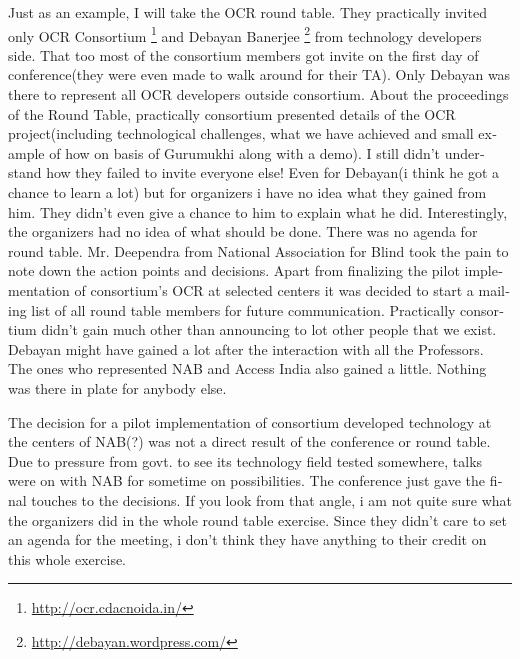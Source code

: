 \begin{english}
Just as an example, I will take the OCR round table. They practically invited only OCR Consortium \footnote{\url{http://ocr.cdacnoida.in/}} and Debayan Banerjee \footnote{\url{http://debayan.wordpress.com/}} from technology developers side. That too most of the consortium members got invite on the first day of conference(they were even made to walk around for their TA). Only Debayan was there to represent all OCR developers outside consortium. About the proceedings of the Round Table, practically consortium presented details of the OCR project(including technological challenges, what we have achieved and small example of how on basis of Gurumukhi along with a demo). I still didn’t understand how they failed to invite everyone else! Even for Debayan(i think he got a chance to learn a lot) but for organizers i have no idea what they gained from him. They didn’t even give a chance to him to explain what he did. Interestingly, the organizers had no idea of what should be done. There was no agenda for round table. Mr. Deependra from National Association for Blind took the pain to note down the action points and decisions. Apart from finalizing the pilot implementation of consortium’s OCR at selected centers it was decided to start a mailing list of all round table members for future communication. Practically consortium didn’t gain much other than announcing to lot other people that we exist. Debayan might have gained a lot after the interaction with all the Professors. The ones who represented NAB and Access India also gained a little. Nothing was there in plate for anybody else.

The decision for a pilot implementation of consortium developed technology at the centers of NAB(?) was not a direct result of the conference or round table. Due to pressure from govt. to see its technology field tested somewhere, talks were on with NAB for sometime on possibilities. The conference just gave the final touches to the decisions. If you look from that angle, i am not quite sure what the organizers did in the whole round table exercise. Since they didn’t care to set an agenda for the meeting, i don’t think they have anything to their credit on this whole exercise.


\end{english}
